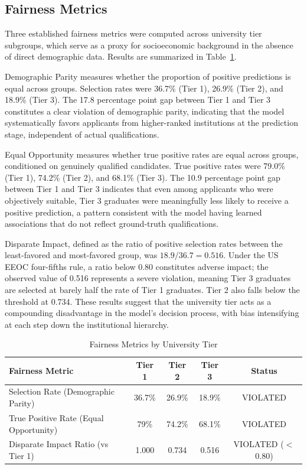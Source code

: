 \documentclass[conference]{IEEEtran}
\begin{document}
\subsection{Fairness Metrics}

Three established fairness metrics were computed across university tier subgroups, which serve as a proxy for socioeconomic background in the absence of direct demographic data. Results are summarized in Table~\ref{tab:fairnessmetrics}.

Demographic Parity measures whether the proportion of positive predictions is equal across groups. Selection rates were 36.7\% (Tier 1), 26.9\% (Tier 2), and 18.9\% (Tier 3). The 17.8 percentage point gap between Tier 1 and Tier 3 constitutes a clear violation of demographic parity, indicating that the model systematically favors applicants from higher-ranked institutions at the prediction stage, independent of actual qualifications.

Equal Opportunity measures whether true positive rates are equal across groups, conditioned on genuinely qualified candidates. True positive rates were 79.0\% (Tier 1), 74.2\% (Tier 2), and 68.1\% (Tier 3). The 10.9 percentage point gap between Tier 1 and Tier 3 indicates that even among applicants who were objectively suitable, Tier 3 graduates were meaningfully less likely to receive a positive prediction, a pattern consistent with the model having learned associations that do not reflect ground-truth qualifications.

Disparate Impact, defined as the ratio of positive selection rates between the least-favored and most-favored group, was $18.9 / 36.7 = 0.516$. Under the US EEOC four-fifths rule, a ratio below 0.80 constitutes adverse impact; the observed value of 0.516 represents a severe violation, meaning Tier 3 graduates are selected at barely half the rate of Tier 1 graduates. Tier 2 also falls below the threshold at 0.734. These results suggest that the university tier acts as a compounding disadvantage in the model's decision process, with bias intensifying at each step down the institutional hierarchy.

\begin{table}[htbp]
\caption{Fairness Metrics by University Tier}
\begin{center}
\begin{tabular}{|p{2.3cm}|c|c|c|c|}
\hline
\textbf{Fairness Metric} & \textbf{Tier 1} & \textbf{Tier 2} & \textbf{Tier 3} & \textbf{Status} \\
\hline
Selection Rate (Demographic Parity) & 36.7\% & 26.9\% & 18.9\% & VIOLATED \\
\hline
True Positive Rate (Equal Opportunity) & 79\% & 74.2\% & 68.1\% & VIOLATED \\
\hline
Disparate Impact Ratio (vs Tier 1) & 1.000 & 0.734 & 0.516 & VIOLATED ($<$0.80) \\
\hline
\end{tabular}
\label{tab:fairnessmetrics}
\end{center}
\end{table}
\end{document}
